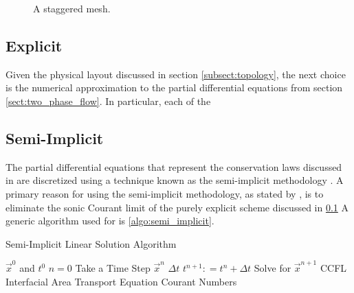 \begin{figure}[ht]
\caption{A staggered mesh.}
\label{fig:staggered_mesh}
\begin{center}
\end{center}
\end{figure}

\subsection{Explicit}
\label{subsect:numerics_explicit}
Given the physical layout discussed in section \ref{subsect:topology}, the next choice is the numerical approximation to the partial differential equations from section \ref{sect:two_phase_flow}.
In particular, each of the

\subsection{Semi-Implicit}
\label{subsect:numerics_semi_implicit}

The partial differential equations that represent the conservation laws discussed in  are discretized using a technique known as the semi-implicit methodology \cite{Liles1978}.
A primary reason for using the semi-implicit methodology, as stated by \citet{Liles1978}, is to eliminate the sonic Courant limit of the purely explicit scheme discussed in \ref{subsect:numerics_explicit}
A generic algorithm used for is \ref{algo:semi_implicit}.

\begin{algo}[H]
\caption{Semi-Implicit Linear Solution Algorithm}
\label{algo:semi_implicit}
\setlength{\baselineskip}{0.625\baselineskip}
\begin{algorithmic}[1]
\Require $\Vec{x}^{0}$ and $t^{0}$
\Set $n = 0$
\Loop \; Take a Time Step
    \Set $\vec{x}^{n}$
    \Calculate $\Delta t$
    \State $t^{n+1} : = t^{n} + \Delta t$
    \BlackBox Solve for $\vec{x}^{n+1}$
    \Test CCFL 
    \BlackBox Interfacial Area Transport Equation
    \Calculate Courant Numbers
\end{algorithmic}
\end{algo}


